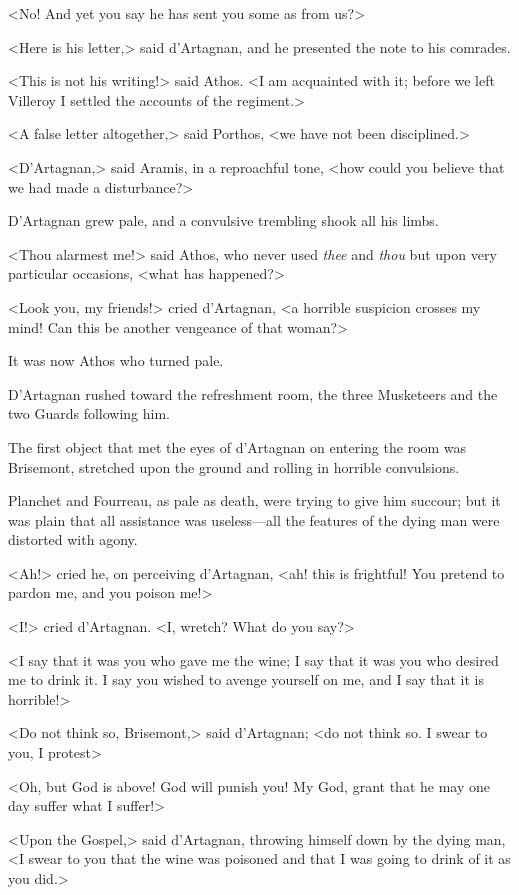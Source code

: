 <No! And yet you say he has sent you some as from us?> 

<Here is his letter,> said d'Artagnan, and he presented the note to his comrades. 

<This is not his writing!> said Athos. <I am acquainted with it; before we left Villeroy I settled the accounts of the regiment.> 

<A false letter altogether,> said Porthos, <we have not been disciplined.> 

<D'Artagnan,> said Aramis, in a reproachful tone, <how could you believe that we had made a disturbance?> 

D'Artagnan grew pale, and a convulsive trembling shook all his limbs. 

<Thou alarmest me!> said Athos, who never used \textit{thee} and \textit{thou} but upon very particular occasions, <what has happened?> 

<Look you, my friends!> cried d'Artagnan, <a horrible suspicion crosses my mind! Can this be another vengeance of that woman?> 

It was now Athos who turned pale. 

D'Artagnan rushed toward the refreshment room, the three Musketeers and the two Guards following him. 

The first object that met the eyes of d'Artagnan on entering the room was Brisemont, stretched upon the ground and rolling in horrible convulsions. 

Planchet and Fourreau, as pale as death, were trying to give him succour; but it was plain that all assistance was useless---all the features of the dying man were distorted with agony. 

<Ah!> cried he, on perceiving d'Artagnan, <ah! this is frightful! You pretend to pardon me, and you poison me!> 

<I!> cried d'Artagnan. <I, wretch? What do you say?> 

<I say that it was you who gave me the wine; I say that it was you who desired me to drink it. I say you wished to avenge yourself on me, and I say that it is horrible!> 

<Do not think so, Brisemont,> said d'Artagnan; <do not think so. I swear to you, I protest\longdash> 

<Oh, but God is above! God will punish you! My God, grant that he may one day suffer what I suffer!> 

<Upon the Gospel,> said d'Artagnan, throwing himself down by the dying man, <I swear to you that the wine was poisoned and that I was going to drink of it as you did.> 

